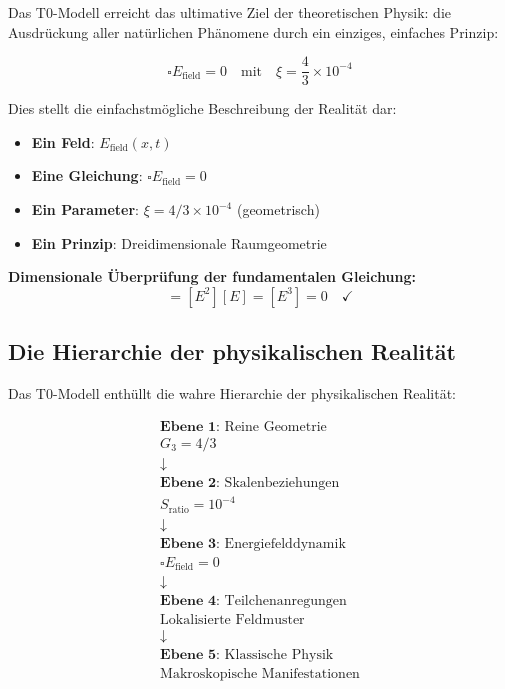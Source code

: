 \documentclass[12pt,a4paper]{report}
\begin{document}
	Das T0-Modell erreicht das ultimative Ziel der theoretischen Physik: die Ausdrückung aller natürlichen Phänomene durch ein einziges, einfaches Prinzip:
	
	\begin{equation}
		\boxed{\square E_{\text{field}} = 0 \quad \text{mit} \quad \xi = \frac{4}{3} \times 10^{-4}}
	\end{equation}
	
	Dies stellt die einfachstmögliche Beschreibung der Realität dar:
	\begin{itemize}
		\item \textbf{Ein Feld}: $E_{\text{field}}(x,t)$
		\item \textbf{Eine Gleichung}: $\square E_{\text{field}} = 0$
		\item \textbf{Ein Parameter}: $\xi = 4/3 \times 10^{-4}$ (geometrisch)
		\item \textbf{Ein Prinzip}: Dreidimensionale Raumgeometrie
	\end{itemize}
	
	\textbf{Dimensionale Überprüfung der fundamentalen Gleichung:}
	\begin{equation}
		[\square E_{\text{field}}] = [E^2][E] = [E^3] = 0 \quad \checkmark
	\end{equation}
	
	\subsection{Die Hierarchie der physikalischen Realität}
	\label{subsec:hierarchy_reality}
	
	Das T0-Modell enthüllt die wahre Hierarchie der physikalischen Realität:
	
	\begin{equation}
		\begin{array}{c}
			\textbf{Ebene 1:} \text{ Reine Geometrie} \\
			G_3 = 4/3 \\
			\downarrow \\
			\textbf{Ebene 2:} \text{ Skalenbeziehungen} \\
			S_{\text{ratio}} = 10^{-4} \\
			\downarrow \\
			\textbf{Ebene 3:} \text{ Energiefelddynamik} \\
			\square E_{\text{field}} = 0 \\
			\downarrow \\
			\textbf{Ebene 4:} \text{ Teilchenanregungen} \\
			\text{Lokalisierte Feldmuster} \\
			\downarrow \\
			\textbf{Ebene 5:} \text{ Klassische Physik} \\
			\text{Makroskopische Manifestationen}
		\end{array}
	\end{equation}
	
\end{document}
